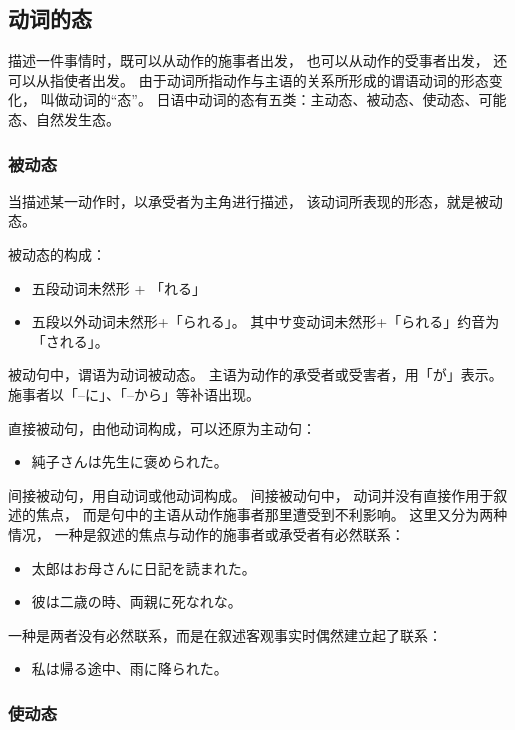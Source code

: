 \subsection{动词的态}%

描述一件事情时，既可以从动作的施事者出发，
也可以从动作的受事者出发，
还可以从指使者出发。
由于动词所指动作与主语的关系所形成的谓语动词的形态变化，
叫做动词的``态''。
日语中动词的态有五类：主动态、被动态、使动态、可能态、自然发生态。

\subsubsection{被动态}%

当描述某一动作时，以承受者为主角进行描述，
该动词所表现的形态，就是被动态。

被动态的构成：
\begin{itemize}
  \item 五段动词未然形 \cn[1] + 「れる」
  \item 五段以外动词未然形+「られる」。
    其中サ变动词未然形+「られる」约音为「される」。
\end{itemize}

被动句中，谓语为动词被动态。
主语为动作的承受者或受害者，用「が」表示。
施事者以「--に」、「--から」等补语出现。

直接被动句，由他动词构成，可以还原为主动句：
\begin{itemize}
  \item 純子さんは先生に褒められた。
\end{itemize}

间接被动句，用自动词或他动词构成。
间接被动句中，
动词并没有直接作用于叙述的焦点，
而是句中的主语从动作施事者那里遭受到不利影响。
这里又分为两种情况，
一种是叙述的焦点与动作的施事者或承受者有必然联系：
\begin{itemize}
  \item 太郎はお母さんに日記を読まれた。
  \item 彼は二歳の時、両親に死なれな。
\end{itemize}
一种是两者没有必然联系，而是在叙述客观事实时偶然建立起了联系：
\begin{itemize}
  \item 私は帰る途中、雨に降られた。
\end{itemize}


\subsubsection{使动态}%

